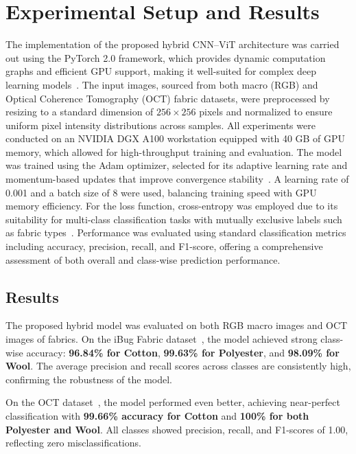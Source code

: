 \section{Experimental Setup and Results}

The implementation of the proposed hybrid CNN–ViT architecture was carried out using the PyTorch 2.0 framework, which provides dynamic computation graphs and efficient GPU support, making it well-suited for complex deep learning models~\cite{paszke2019pytorch}. The input images, sourced from both macro (RGB) and Optical Coherence Tomography (OCT) fabric datasets, were preprocessed by resizing to a standard dimension of $256 \times 256$ pixels and normalized to ensure uniform pixel intensity distributions across samples. All experiments were conducted on an NVIDIA DGX A100 workstation equipped with 40 GB of GPU memory, which allowed for high-throughput training and evaluation. The model was trained using the Adam optimizer, selected for its adaptive learning rate and momentum-based updates that improve convergence stability~\cite{kingma2014adam}. A learning rate of 0.001 and a batch size of 8 were used, balancing training speed with GPU memory efficiency. For the loss function, cross-entropy was employed due to its suitability for multi-class classification tasks with mutually exclusive labels such as fabric types~\cite{goodfellow2016deep}. Performance was evaluated using standard classification metrics including accuracy, precision, recall, and F1-score, offering a comprehensive assessment of both overall and class-wise prediction performance.

\subsection{Results}

The proposed hybrid model was evaluated on both RGB macro images and OCT images of fabrics. On the iBug Fabric dataset~\cite{researchgate}, the model achieved strong class-wise accuracy: \textbf{96.84\% for Cotton}, \textbf{99.63\% for Polyester}, and \textbf{98.09\% for Wool}. The average precision and recall scores across classes are consistently high, confirming the robustness of the model.

On the OCT dataset~\cite{kampouris2016fine}, the model performed even better, achieving near-perfect classification with \textbf{99.66\% accuracy for Cotton} and \textbf{100\% for both Polyester and Wool}. All classes showed precision, recall, and F1-scores of 1.00, reflecting zero misclassifications.

